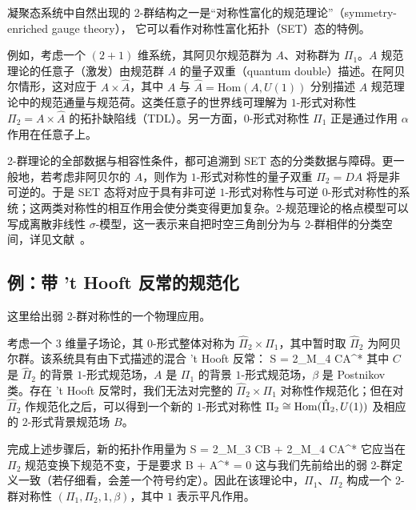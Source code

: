 凝聚态系统中自然出现的 2-群结构之一是“对称性富化的规范理论”（symmetry-enriched gauge theory），
它可以看作对称性富化拓扑（SET）态的特例\cite{etingof2010fusion,PhysRevB.87.155115,PhysRevB.87.165107,Chang_2015,PhysRevB.93.155121,PhysRevB.94.235136,PhysRevB.96.115107,PhysRevB.100.115147,10.21468/SciPostPhys.8.2.028,PhysRevB.106.115104}。

例如，考虑一个 $(2+1)$ 维系统，其阿贝尔规范群为 $A$、对称群为 $\Pi_1$。$A$ 规范理论的任意子（激发）由规范群 $A$ 的量子双重（quantum double）描述。在阿贝尔情形，这对应于 $A\times\hat{A}$，其中 $A$ 与 $\hat{A}=\text{Hom}(A,U(1))$ 分别描述 $A$ 规范理论中的规范通量与规范荷。这类任意子的世界线可理解为 $1$-形式对称性 $\Pi_2=A\times\hat{A}$ 的拓扑缺陷线（TDL）。另一方面，$0$-形式对称性 $\Pi_1$ 正是通过作用 $\alpha$ 作用在任意子上。

2-群理论的全部数据与相容性条件，都可追溯到 SET 态的分类数据与障碍\cite{etingof2010fusion,PhysRevB.100.115147,wang2021domain}。更一般地，若考虑非阿贝尔的 $A$，则作为 $1$-形式对称性的量子双重 $\Pi_2=DA$ 将是非可逆的。于是 SET 态将对应于具有非可逆 $1$-形式对称性与可逆 $0$-形式对称性的系统；这两类对称性的相互作用会使分类变得更加复杂\cite{etingof2010fusion,PhysRevB.100.115147}。2-规范理论的格点模型可以写成离散非线性 $\sigma$-模型，这一表示来自把时空三角剖分为与 2-群相伴的分类空间，详见文献~\cite{PhysRevB.100.045105}。

\subsection{例：带 't Hooft 反常的规范化}
\label{sec:2-group-gauging}

这里给出弱 2-群对称性的一个物理应用。

考虑一个 3 维量子场论，其 $0$-形式整体对称为 $\hat{\Pi}_2\times \Pi_1$，其中暂时取 $\hat{\Pi}_2$ 为阿贝尔群。该系统具有由下式描述的混合 't Hooft 反常：
\be S = 2\pi \int_{M_4} C\cup A^*\beta  \ee
其中 $C$ 是 $\hat{\Pi}_2$ 的背景 $1$-形式规范场，$A$ 是 $\Pi_1$ 的背景 $1$-形式规范场，$\beta$ 是 Postnikov 类。存在 't Hooft 反常时，我们无法对完整的 $\hat{\Pi}_2\times \Pi_1$ 对称性作规范化；但在对 $\hat{\Pi}_2$ 作规范化之后，可以得到一个新的 $1$-形式对称性 $\Pi_2\cong {\rm Hom}(\hat{\Pi}_2,U(1))$ 及相应的 $2$-形式背景规范场 $B$。

完成上述步骤后，新的拓扑作用量为
\be S = 2\pi \int_{M_3} C\cup B  + 2\pi \int_{M_4} C\cup A^*\beta \ee
它应当在 $\Pi_2$ 规范变换下规范不变，于是要求
\be  \delta B + A^* \beta = 0 \ee
这与我们先前给出的弱 2-群定义一致（若仔细看，会差一个符号约定）。因此在该理论中，$\Pi_1$、$\Pi_2$ 构成一个 2-群对称性 $(\Pi_1,\Pi_2,1,\beta)$，其中 $1$ 表示平凡作用。

